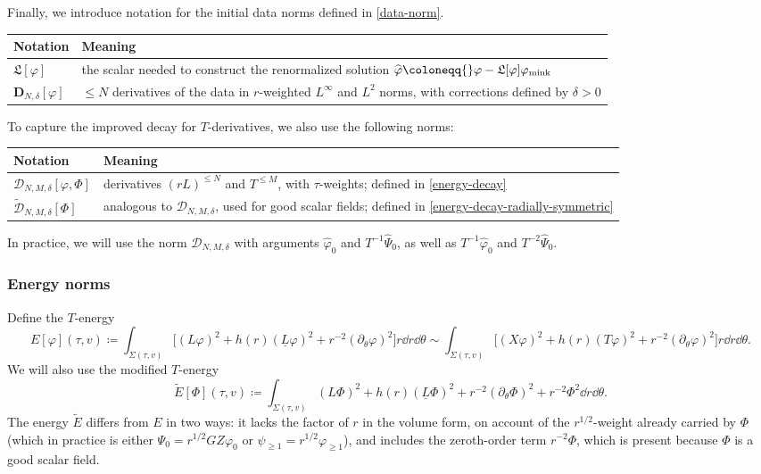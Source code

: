 \documentclass[10pt, reqno]{amsart}
\begin{document}
Finally, we introduce notation for the initial data norms defined in \cref{data-norm}.
\begin{center}
\begin{tabular}{ll}
Notation & Meaning\\
\hline
\(\mathfrak{L}[\varphi{}]\) & the scalar needed to construct the renormalized solution \(\widehat{\varphi{}}\coloneqq{}\varphi{}-\mathfrak{L}[\varphi{}]\varphi_{\textnormal{mink}}\)\\
\(\mathbf{D}_{N,\delta{}}[\varphi{}]\) & \(\le N\) derivatives of the data in \(r\)-weighted \(L^\infty\) and \(L^2\) norms, with corrections defined by \(\delta{}>0\)\\

\end{tabular}
\end{center}
To capture the improved decay for \(T\)-derivatives, we also use the following
norms:
\begin{center}
\begin{tabular}{ll}
Notation & Meaning\\
\hline
\(\mathcal{D}_{N,M,\delta{}}[\varphi{},\Phi{}]\) & derivatives \((rL)^{\le N}\) and \(T^{\le M}\), with \(\tau{}\)-weights; defined in \cref{energy-decay}\\
\(\tilde{\mathcal{D}}_{N,M,\delta{}}[\Phi{}]\) & analogous to \(\mathcal{D}_{N,M,\delta{}}\), used for good scalar fields; defined in \cref{energy-decay-radially-symmetric}\\

\end{tabular}
\end{center}
In practice, we will use the norm \(\mathcal{D}_{N,M,\delta{}}\) with arguments
\(\widehat{\varphi{}}_0\) and \(T^{-1}\widehat{\Psi{}}_0\), as well as
\(T^{-1}\widehat{\varphi{}}_0\) and \(T^{-2}\widehat{\Psi{}}_0\).
\subsubsection{Energy norms}
\label{energy-norms}
Define the \(T\)-energy
\begin{equation}\label{T-energy-def}
E[\varphi{}](\tau{},v)\coloneqq{}\int _{\Sigma{}(\tau{},v)}\bigl[(L\varphi{})^2 + h(r)(\underline{L}\varphi{})^2 + r^{-2}(\partial{}_\theta{}\varphi{})^2\bigr]r\dd{}r\dd{}\theta{}\sim \int _{\Sigma{}(\tau{},v)}\bigl[(X\varphi{})^2 + h(r)(T\varphi{})^2 + r^{-2}(\partial{}_\theta{}\varphi{})^2\bigr]r\dd{}r\dd{}\theta{}.
\end{equation}
We will also use the modified \(T\)-energy
\begin{equation}
\tilde{E}[\Phi{}](\tau{},v) \coloneqq{} \int _{\Sigma{}(\tau{},v)} (L\Phi{})^2 + h(r)(\underline{L}\Phi{})^2 + r^{-2}(\partial{}_\theta{}\Phi{})^2 + r^{-2}\Phi^2\dd{}r\dd{}\theta{}.
\end{equation}
The energy \(\tilde{E}\) differs from \(E\) in two ways: it lacks the factor of
\(r\) in the volume form, on account of the \(r^{1/2}\)-weight already carried
by \(\Phi{}\) (which in practice is either \(\Psi_0 = r^{1/2}GZ\varphi_0\) or
\(\psi_{\ge 1} = r^{1/2}\varphi_{\ge 1}\)), and includes the zeroth-order term
\(r^{-2}\Phi{}\), which is present because \(\Phi{}\) is a good scalar field.
\end{document}
